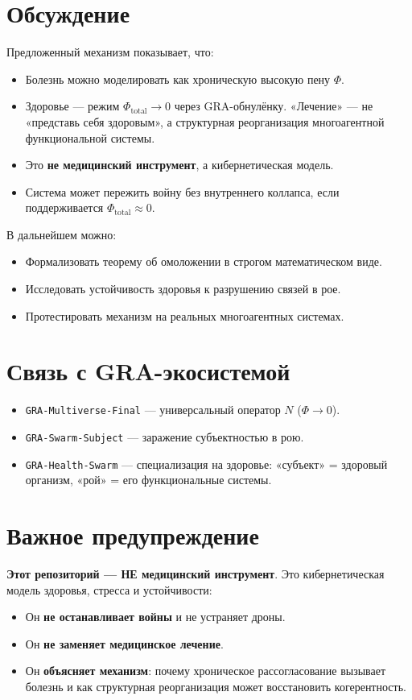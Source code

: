 \documentclass[11pt,a4paper]{article}
\begin{document}
\section{Обсуждение}

Предложенный механизм показывает, что:
\begin{itemize}
  \item Болезнь можно моделировать как хроническую высокую пену $\Phi$.
  \item Здоровье — режим $\Phi_{\text{total}} \to 0$ через GRA-обнулёнку.
  «Лечение» — не «представь себя здоровым», а структурная реорганизация многоагентной функциональной системы.
  \item Это \textbf{не медицинский инструмент}, а кибернетическая модель.
  \item Система может пережить войну без внутреннего коллапса, если поддерживается $\Phi_{\text{total}} \approx 0$.
\end{itemize}

В дальнейшем можно:
\begin{itemize}
  \item Формализовать теорему об омоложении в строгом математическом виде.
  \item Исследовать устойчивость здоровья к разрушению связей в рое.
  \item Протестировать механизм на реальных многоагентных системах.
\end{itemize}

\section{Связь с GRA-экосистемой}

\begin{itemize}
  \item \texttt{GRA-Multiverse-Final} — универсальный оператор $N$ ($\Phi \to 0$).
  \item \texttt{GRA-Swarm-Subject} — заражение субъектностью в рою.
  \item \texttt{GRA-Health-Swarm} — специализация на здоровье: «субъект» = здоровый организм, «рой» = его функциональные системы.
\end{itemize}

\section*{Важное предупреждение}

\textbf{Этот репозиторий — НЕ медицинский инструмент}. Это кибернетическая модель здоровья, стресса и устойчивости:
\begin{itemize}
  \item Он \textbf{не останавливает войны} и не устраняет дроны.
  \item Он \textbf{не заменяет медицинское лечение}.
  \item Он \textbf{объясняет механизм}: почему хроническое рассогласование вызывает болезнь и как структурная реорганизация может восстановить когерентность.
\end{itemize}
\end{document}
